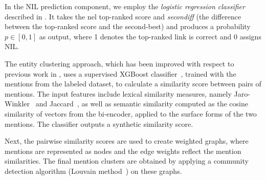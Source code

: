 In the NIL prediction component, we employ the \textit{logistic regression classifier} described in .
It takes the \ac{nel} top-ranked score and \emph{secondiff} (the difference between the top-ranked score and the second-best) and produces a probability $p \in [0,1]$ as output, where 1 denotes the top-ranked link is correct and 0 assigns NIL.



The entity clustering approach, which has been improved with respect to previous work in , uses a supervised XGBoost classifier~\cite{chen2016xgboost}, trained with the mentions from the labeled dataset, to calculate a similarity score between pairs of mentions. The input features include lexical similarity measures, namely Jaro-Winkler~\cite{winkler1990string} and Jaccard~\cite{jaccard1901etude}, as well as semantic similarity computed as the cosine similarity of vectors from the \blinkita bi-encoder, applied to the surface forms of the two mentions. The classifier outputs a synthetic similarity score.  

Next, the pairwise similarity scores are used to create weighted graphs, where mentions are represented as nodes and the edge weights reflect the mention similarities. The final mention clusters are obtained by applying a community detection algorithm (Louvain method~\cite{blondel2008fast}) on these graphs.

